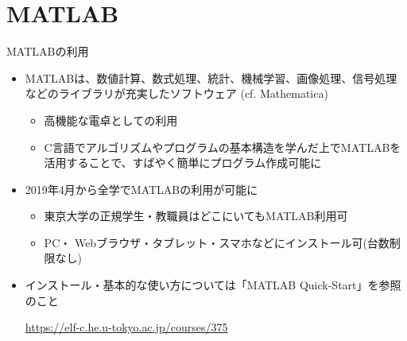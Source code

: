 \section{MATLAB}

\begin{frame}[t,fragile]{MATLABの利用}
  \begin{itemize}
  \item MATLABは、数値計算、数式処理、統計、機械学習、画像処理、信号処理などのライブラリが充実したソフトウェア (cf. Mathematica)
    \begin{itemize}
    \item 高機能な電卓としての利用
    \item C言語でアルゴリズムやプログラムの基本構造を学んだ上でMATLABを活用することで、すばやく簡単にプログラム作成可能に
    \end{itemize}
  \item 2019年4月から全学でMATLABの利用が可能に
    \begin{itemize}
      \item 東京大学の正規学生・教職員はどこにいてもMATLAB利用可
      \item PC・ Webブラウザ・タブレット・スマホなどにインストール可(台数制限なし)
    \end{itemize}
  \item インストール・基本的な使い方については「MATLAB Quick-Start」を参照のこと

    \href{https://elf-c.he.u-tokyo.ac.jp/courses/375}{https://elf-c.he.u-tokyo.ac.jp/courses/375}
  \end{itemize}
\end{frame}
